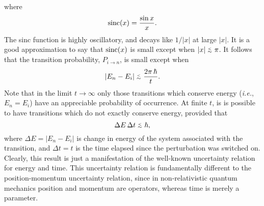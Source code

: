 where 
\begin{equation}
{\rm sinc}(x)= \frac{\sin x}{x}.
\end{equation}
The sinc function is highly oscillatory, and decays like $1/|x|$ 
at large $|x|$. It is a good approximation to say that ${\rm sinc}(x)$ 
is small except when $|x| \stackrel {_{\normalsize<}}{_{\normalsize \sim}} \pi$. It follows that the
transition probability, $P_{i\rightarrow n}$,  is small except when
\begin{equation}
|E_n - E_i| \stackrel {_{\normalsize<}}{_{\normalsize \sim}} \frac{2\pi\, \hbar}{t}.
\end{equation}
Note that in the limit $t\rightarrow \infty$ only those transitions
which conserve energy ({\em i.e.}, $E_n=E_i$) have  an appreciable
probability of occurrence. At finite $t$, is is possible to
have transitions which do not exactly conserve energy, provided that
\begin{equation}
\Delta E \,\Delta t \stackrel {_{\normalsize<}}{_{\normalsize \sim}} \hbar,
\end{equation}
where $\Delta E = |E_n - E_i|$ is change in energy of the system associated
with the transition, and $\Delta t = t$ is the time elapsed since the
perturbation was switched on. Clearly, this result is just a manifestation
of the well-known uncertainty relation for energy and time. This 
uncertainty relation is fundamentally different to the position-momentum
uncertainty relation, since in non-relativistic quantum mechanics
position and momentum are operators, whereas time is merely a parameter. 

